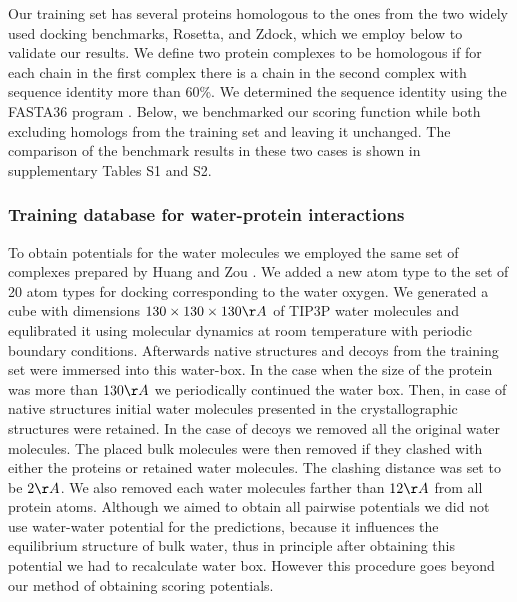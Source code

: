 Our training set has several proteins homologous to the ones from the two widely used docking benchmarks, Rosetta, and Zdock, which we employ below to validate our results. 
We define two protein complexes to be homologous if for each chain in the first complex there is a chain in the second complex with sequence identity more than 60\%. 
We determined the sequence identity using the FASTA36 program \cite{Pearson1997}. Below, we benchmarked our scoring function while both excluding homologs from the training set
and leaving it unchanged. The comparison of the benchmark results in these two cases is shown in supplementary Tables S1 and S2.




\subsubsection{Training database for water-protein interactions}
To obtain potentials for the water molecules we employed the same set of complexes prepared by Huang and Zou \cite{Huang2008}. We added a new atom type to the set of 
20 atom types for docking corresponding to the water oxygen. We generated a cube with dimensions $130\times 130 \times 130\AA$ of TIP3P water molecules and equlibrated 
it using molecular dynamics at room temperature with periodic boundary conditions. Afterwards native structures and decoys from the training set were immersed into this water-box. In the case
when the size of the protein was more than $130\AA$ we periodically continued the water box. Then, in case of native structures initial water molecules presented in the 
crystallographic structures were retained. In the case of decoys we removed all the original water molecules. The placed bulk molecules were then removed if they clashed 
with either the proteins or retained water molecules. The clashing distance was set to be $2\AA$. We also removed each water molecules farther than $12\AA$ from all protein atoms.
Although we aimed to obtain all pairwise potentials we did not use water-water potential for the predictions, because it influences the equilibrium structure of bulk water,
thus in principle after obtaining this potential we had to recalculate water box. However this procedure goes beyond our method of obtaining scoring potentials.
